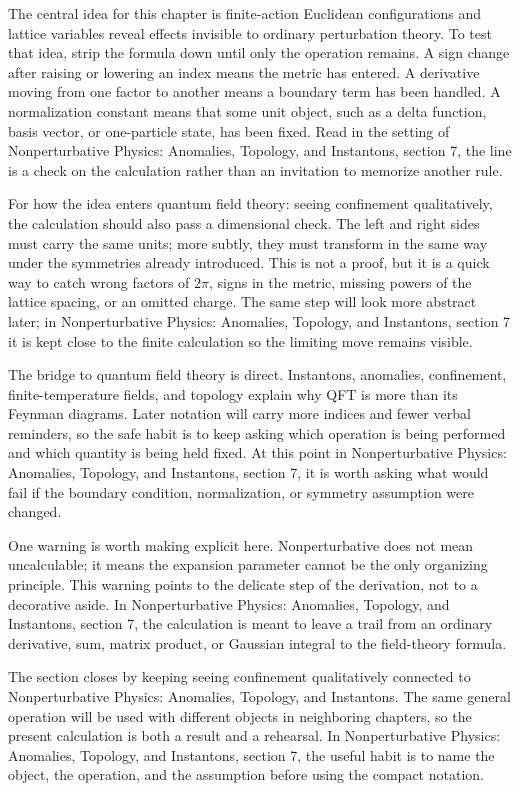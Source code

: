 The central idea for this chapter is finite-action Euclidean configurations and lattice variables reveal effects invisible to ordinary perturbation theory.  To test that idea, strip the formula down until only the operation remains.  A sign change after raising or lowering an index means the metric has entered.  A derivative moving from one factor to another means a boundary term has been handled.  A normalization constant means that some unit object, such as a delta function, basis vector, or one-particle state, has been fixed.  Read in the setting of Nonperturbative Physics: Anomalies, Topology, and Instantons, section 7, the line is a check on the calculation rather than an invitation to memorize another rule.

For how the idea enters quantum field theory: seeing confinement qualitatively, the calculation should also pass a dimensional check.  The left and right sides must carry the same units; more subtly, they must transform in the same way under the symmetries already introduced.  This is not a proof, but it is a quick way to catch wrong factors of \(2\pi\), signs in the metric, missing powers of the lattice spacing, or an omitted charge.  The same step will look more abstract later; in Nonperturbative Physics: Anomalies, Topology, and Instantons, section 7 it is kept close to the finite calculation so the limiting move remains visible.

The bridge to quantum field theory is direct.  Instantons, anomalies, confinement, finite-temperature fields, and topology explain why QFT is more than its Feynman diagrams.  Later notation will carry more indices and fewer verbal reminders, so the safe habit is to keep asking which operation is being performed and which quantity is being held fixed.  At this point in Nonperturbative Physics: Anomalies, Topology, and Instantons, section 7, it is worth asking what would fail if the boundary condition, normalization, or symmetry assumption were changed.

One warning is worth making explicit here.  Nonperturbative does not mean uncalculable; it means the expansion parameter cannot be the only organizing principle.  This warning points to the delicate step of the derivation, not to a decorative aside.  In Nonperturbative Physics: Anomalies, Topology, and Instantons, section 7, the calculation is meant to leave a trail from an ordinary derivative, sum, matrix product, or Gaussian integral to the field-theory formula.

The section closes by keeping seeing confinement qualitatively connected to Nonperturbative Physics: Anomalies, Topology, and Instantons.  The same general operation will be used with different objects in neighboring chapters, so the present calculation is both a result and a rehearsal.  In Nonperturbative Physics: Anomalies, Topology, and Instantons, section 7, the useful habit is to name the object, the operation, and the assumption before using the compact notation.



